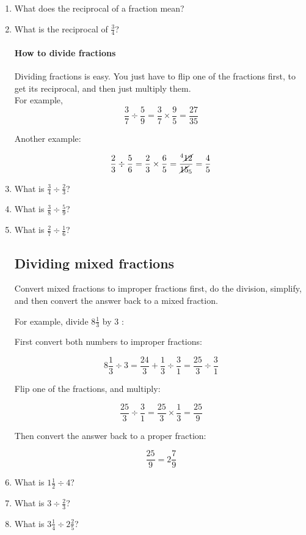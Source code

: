 \documentclass[14pt]{article}
\begin{document}
\begin{enumerate}
\item What does the reciprocal of a fraction mean?
\item What is the reciprocal of $\frac{3}{4}$?

\paragraph{How to divide fractions}
Dividing fractions is easy. You just have to flip one of the fractions first, to get its reciprocal, and then just multiply them.\\

For example,
$$\frac{3}{7} \div \frac{5}{9} = \frac{3}{7} \times \frac{9}{5} = \frac{27}{35}$$

Another example:

$$\frac{2}{3} \div \frac{5}{6} = \frac{2}{3} \times \frac{6}{5} = \frac{^4\cancel{12}}{\cancel{15}_5} = \frac{4}{5}$$

\item What is $\frac{3}{4} \div \frac{2}{3}$?
\item What is $\frac{3}{8} \div \frac{5}{9}$?
\item What is $\frac{2}{7} \div \frac{1}{6}$?

\subsection*{Dividing mixed fractions}
Convert mixed fractions to improper fractions first, do the division, simplify, and then convert the answer back to a mixed fraction.

For example, divide $8 \frac{1}{3}$ by 3 :

First convert both numbers to improper fractions:

$$8\frac{1}{3} \div 3 = \frac{24}{3} + \frac{1}{3} \div \frac{3}{1} = \frac{25}{3} \div \frac{3}{1}$$

Flip one of the fractions, and multiply:

$$\frac{25}{3} \div \frac{3}{1} = \frac{25}{3} \times \frac{1}{3} = \frac{25}{9}$$

Then convert the answer back to a proper fraction:

$$\frac{25}{9} = 2 \frac{7}{9}$$

\item What is $1 \frac{1}{2} \div 4$?
\item What is $3 \div \frac{2}{3}$?
\item What is $3 \frac{1}{4} \div 2 \frac{2}{5}$?


\end{enumerate}
\end{document}
